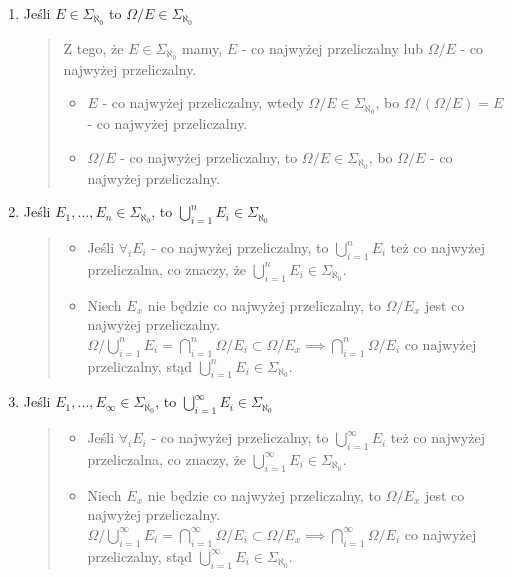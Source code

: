 \begin{enumerate}
\begin{quote}
		      Dla \(\Omega\) mamy, że \(\Omega / \Omega = \emptyset\) który jest przeliczalny, stąd \(\Omega \in \Sigma_{\aleph_{0}}\).
	      \end{quote}
	\item Jeśli \(E \in \Sigma_{\aleph_{0}}\) to \(\Omega/E \in \Sigma_{\aleph_{0}}\)
	      \begin{quote}
		      Z tego, że \(E \in \Sigma_{\aleph_{0}}\) mamy, \(E\) - co najwyżej przeliczalny lub \(\Omega/E\) - co najwyżej przeliczalny.
		      \begin{itemize}
			      \item \(E\) - co najwyżej przeliczalny, wtedy \(\Omega/E \in \Sigma_{\aleph_{0}}\), bo \(\Omega/(\Omega/E) = E\) - co najwyżej przeliczalny.
			      \item \(\Omega/E\) - co najwyżej przeliczalny, to \(\Omega/E \in \Sigma_{\aleph_{0}}\), bo \(\Omega/E\) - co najwyżej przeliczalny.
		      \end{itemize}
	      \end{quote}
	\item Jeśli \(E_{1},\dots,E_{n} \in \Sigma_{\aleph_{0}}\), to \(\bigcup^{n}_{i=1}E_{i}\in\Sigma_{\aleph_{0}}\)
	      \begin{quote}
		      \begin{itemize}
			      \item Jeśli \(\forall_{i}E_{i}\) - co najwyżej przeliczalny, to \(\bigcup^{n}_{i=1}E_{i}\) też co najwyżej przeliczalna, co znaczy, że \(\bigcup^{n}_{i=1}E_{i}\in\Sigma_{\aleph_{0}}\).
			      \item Niech \(E_{x}\) nie będzie co najwyżej przeliczalny, to \(\Omega/E_{x}\) jest co najwyżej przeliczalny. \(\Omega/\bigcup^{n}_{i=1}E_{i} = \bigcap^{n}_{i=1}\Omega/E_{i} \subset \Omega/E_{x} \implies \bigcap^{n}_{i=1}\Omega/E_{i}\) co najwyżej przeliczalny, stąd \(\bigcup^{n}_{i=1}E_{i}\in\Sigma_{\aleph_{0}}\).
		      \end{itemize}
	      \end{quote}
	\item Jeśli \(E_{1},\dots,E_{\infty} \in \Sigma_{\aleph_{0}}\), to \(\bigcup^{\infty}_{i=1}E_{i}\in\Sigma_{\aleph_{0}}\)
	      \begin{quote}
		      \begin{itemize}
			      \item Jeśli \(\forall_{i}E_{i}\) - co najwyżej przeliczalny, to \(\bigcup^{\infty}_{i=1}E_{i}\) też co najwyżej przeliczalna, co znaczy, że \(\bigcup^{\infty}_{i=1}E_{i}\in\Sigma_{\aleph_{0}}\).
			      \item Niech \(E_{x}\) nie będzie co najwyżej przeliczalny, to \(\Omega/E_{x}\) jest co najwyżej przeliczalny. \(\Omega/\bigcup^{\infty}_{i=1}E_{i} = \bigcap^{\infty}_{i=1}\Omega/E_{i} \subset \Omega/E_{x} \implies \bigcap^{\infty}_{i=1}\Omega/E_{i}\) co najwyżej przeliczalny, stąd \(\bigcup^{\infty}_{i=1}E_{i}\in\Sigma_{\aleph_{0}}\).
		      \end{itemize}
	      \end{quote}
\end{enumerate}

\(
\boxed{\text{}}
\)
